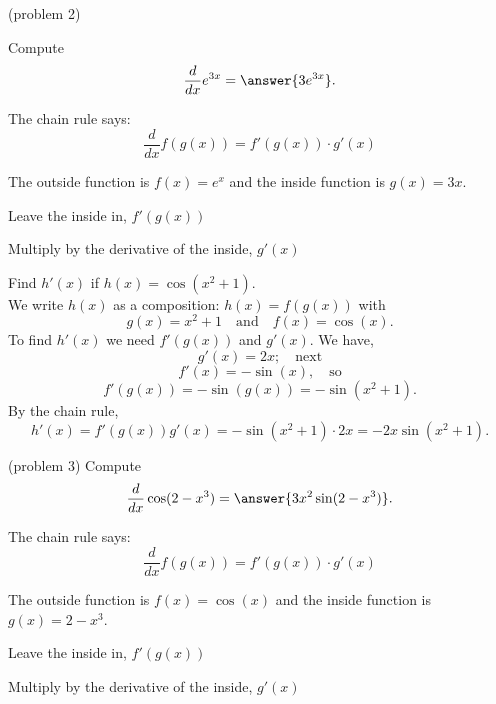 \documentclass{ximera}
\begin{document}
\begin{problem}(problem 2)
  
Compute
  \[
  \frac{d}{dx} e^{3x} = \answer{3e^{3x}}.
  \]
  
    \begin{hint}
      The chain rule says:
      \[
      \frac{d}{dx} f(g(x)) = f'(g(x))\cdot g'(x)
      \]
    \end{hint}
    \begin{hint}
      The outside function is $f(x) = e^x$ and the inside
      function is $g(x) = 3x$.
    \end{hint}
    \begin{hint}
		  Leave the inside in, $f'(g(x))$
		\end{hint}
		\begin{hint}
		  Multiply by the derivative of the inside, $g'(x)$
		\end{hint}
    
\end{problem}


\begin{example}[example 3]
Find $h'(x)$ if $h(x) = \cos(x^2 + 1)$.\\
We write $h(x)$ as a composition: $h(x)=f(g(x))$ with
\[
g(x) = x^2 + 1  \quad \text{and} \quad  f(x) = \cos(x).
\]
To find $h'(x)$ we need $f'(g(x))$ and $g'(x)$. We have,
\[
g'(x) = 2x; \quad \text{next}
\]
\[
f'(x) = -\sin(x), \quad \text{so}
\]
\[
f'(g(x))= -\sin(g(x)) = -\sin(x^2 + 1).
\]
By the chain rule,
\[
h'(x) = f'(g(x))g'(x) = -\sin(x^2 + 1) \cdot 2x = -2x\sin(x^2 + 1).
\]

\end{example}


\begin{center}
\begin{foldable}
\end{foldable}
\end{center}

\begin{problem}(problem 3)
  Compute
  \[
  \frac{d}{dx} \cos(2-x^3) = \answer{3x^2\sin(2-x^3)}.
  \]
  
    \begin{hint}
      The chain rule says:
      \[
      \frac{d}{dx} f(g(x)) = f'(g(x))\cdot g'(x)
      \]
    \end{hint}
    \begin{hint}
      The outside function is $f(x) = \cos(x)$ and the inside
      function is $g(x) = 2-x^3$.
    \end{hint}
    \begin{hint}
		  Leave the inside in, $f'(g(x))$
		\end{hint}
		\begin{hint}
		  Multiply by the derivative of the inside, $g'(x)$
		\end{hint}
    
\end{problem}
\end{document}

